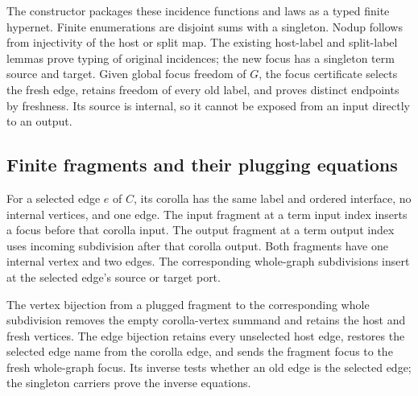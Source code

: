 The constructor packages these incidence functions and laws as a typed finite
hypernet. Finite enumerations are disjoint sums with a singleton. Nodup follows
from injectivity of the host or split map. The existing host-label and split-label
lemmas prove typing of original incidences; the new focus has a singleton term
source and target. Given global focus freedom of $G$, the focus certificate
selects the fresh edge, retains freedom of every old label, and proves distinct
endpoints by freshness. Its source is internal, so it cannot be exposed from
an input directly to an output.

\subsection{Finite fragments and their plugging equations}
\begin{definition}\label{term:search-fragment}
For a selected edge $e$ of $C$, its corolla has the same label and ordered
interface, no internal vertices, and one edge. The input fragment at a term
input index inserts a focus before that corolla input. The output fragment at
a term output index uses incoming subdivision after that corolla output.
Both fragments have one internal vertex and two edges. The corresponding
whole-graph subdivisions insert at the selected edge's source or target port.
\end{definition}
The vertex bijection from a plugged fragment to the corresponding whole
subdivision removes the empty corolla-vertex summand and retains the host and
fresh vertices. The edge bijection retains every unselected host edge, restores
the selected edge name from the corolla edge, and sends the fragment focus to
the fresh whole-graph focus. Its inverse tests whether an old edge is the
selected edge; the singleton carriers prove the inverse equations.

